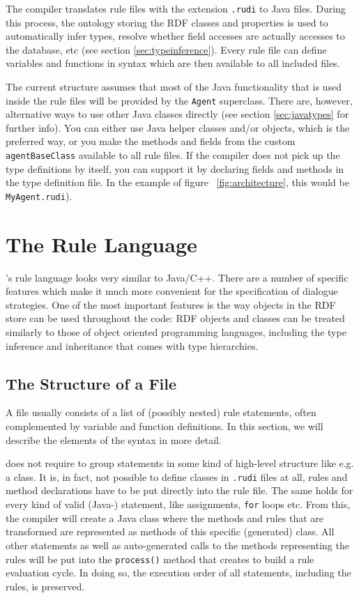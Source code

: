 The \vonda compiler translates rule files with the extension \texttt{.rudi} to
Java files. During this process, the ontology storing the RDF classes and
properties is used to automatically infer types, resolve whether field accesses
are actually accesses to the database, etc (see section
\ref{sec:typeinference}).
Every rule file can define variables and functions in \vonda syntax which are
then available to all included files.

The current structure assumes that most of the Java functionality that
is used inside the rule files will be provided by the \texttt{Agent}
superclass. There are, however, alternative ways to use other Java
classes directly (see section \ref{sec:javatypes} for further
info). You can either use Java helper classes and/or objects, which is
the preferred way, or you make the methods and fields from the custom
\texttt{agentBaseClass} available to all rule files. If the compiler
does not pick up the type definitions by itself, you can support it by
declaring fields and methods in the type definition file. In the
example of figure ~\ref{fig:architecture}, this would be
\texttt{MyAgent.rudi}).

\section{The \vonda Rule Language}
\label{sec:language}
\vonda's rule language looks very similar to Java/C++. There are a number of
specific features which make it much more convenient for the specification of
dialogue strategies. One of the most important features is the way objects in
the RDF store can be used throughout the code: RDF objects and classes can be
treated similarly to those of object oriented programming languages, including
the type inference and inheritance that comes with type hierarchies.

\subsection{The Structure of a \vonda File}

A \vonda file usually consists of a list of (possibly nested) rule statements,
often complemented by variable and function definitions. In this section, we
will describe the elements of the syntax in more detail.

\vonda does not require to group statements in some kind of high-level
structure like e.g. a class. It is, in fact, not possible to define classes in
\texttt{.rudi} files at all, rules and method declarations have to be put
directly into the rule file. The same holds for every kind of valid
(Java-) statement, like assignments, \texttt{for} loops etc. From this, the
compiler will create a Java class where the methods and rules that are
transformed are represented as methods of this specific (generated)
class. All other statements as well as auto-generated calls to the methods
representing the rules will be put into the \texttt{process()} method that
\vonda creates to build a rule evaluation cycle. In doing so, the execution
order of all statements, including the rules, is preserved.

